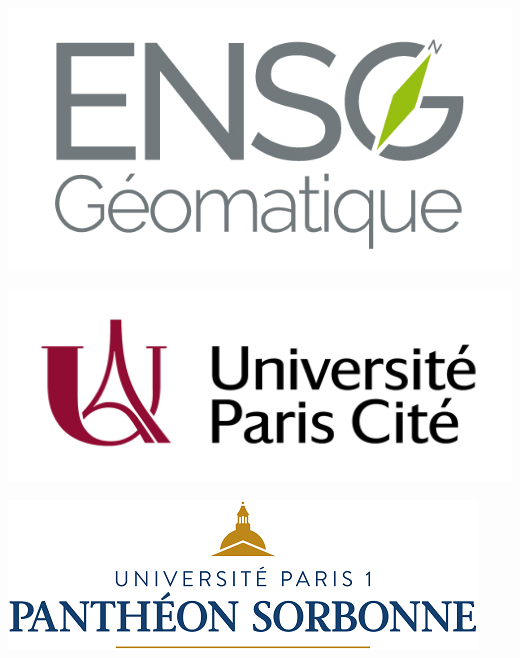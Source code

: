 \begin{titlepage}
\begin{center}
        \begin{minipage}{0.3\textwidth}
            \centering
            \includegraphics[width=.6\linewidth]{ensg.png}
        \end{minipage}\hfill
        \begin{minipage}{0.3\textwidth}
            \centering
            \includegraphics[width=.7\linewidth]{pariscite.jpg}
        \end{minipage}
        \begin{minipage}{0.3\textwidth}
            \centering
            \includegraphics[width=.7\linewidth]{sorbonne.png}
        \end{minipage}

             
    \end{center}
 \end{titlepage}